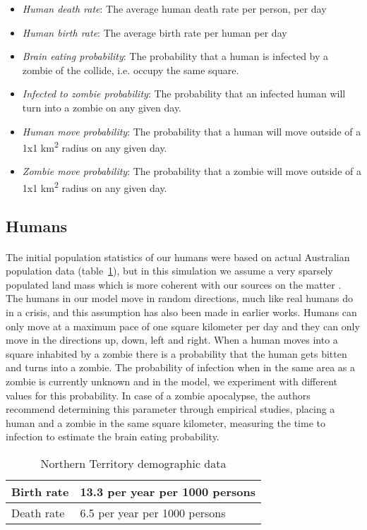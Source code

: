\documentclass{report}
\begin{document}
\begin{itemize}
\item \emph{Human death rate}: The average human death rate per person, per day
\item \emph{Human birth rate}: The average birth rate per human per day
\item \emph{Brain eating probability}: The probability that a human is infected by a zombie of the collide, i.e. occupy the same square.
\item \emph{Infected to zombie probability}: The probability that an infected human will turn into a zombie on any given day.
\item \emph{Human move probability}: The probability that a human will move outside of a 1x1 km\textsuperscript{2} radius on any given day.
\item \emph{Zombie move probability}: The probability that a zombie will move outside of a 1x1 km\textsuperscript{2} radius on any given day.
\end{itemize}

\subsection{Humans}
\paragraph{}
The initial population statistics of our humans were based on actual Australian population data (table~\ref{AustralianData}), but in this simulation we assume a very sparsely populated land mass which is more coherent with our sources on the matter\cite{zombieland} . The humans in our model move in random directions, much like real humans do in a crisis, and this assumption has also been made in earlier works\cite{munz}. Humans can only move at a maximum pace of one square kilometer per day and they can only move in the directions up, down, left and right. When a human moves into a square inhabited by a zombie there is a probability that the human gets bitten and turns into a zombie. The probability of infection when in the same area as a zombie is currently unknown and in the model, we experiment with different values for this probability. In case of a zombie apocalypse, the authors recommend determining this parameter through empirical studies, placing a human and a zombie in the same square kilometer, measuring the time to infection to estimate the brain eating probability.
\begin{table}[!h]
\centering
    \begin{tabular}{|l|l|}
      \hline
        Birth rate & 13.3 per year per 1000 persons \\
      \hline
        Death rate & 6.5 per year per 1000 persons \\
      \hline
\end{tabular}
\caption{Northern Territory demographic data}\label{AustralianData}
\end{table}
\end{document}
